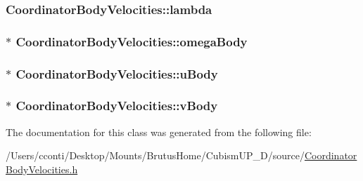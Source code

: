 \subsubsection[{lambda}]{ Coordinator\+Body\+Velocities\+::lambda\hspace{0.3cm}{\ttfamily [protected]}}\label{class_coordinator_body_velocities_afd8b8760d3e9f7fe256ced94c5c8ba15}
\hypertarget{class_coordinator_body_velocities_a90b12064de38ba17d4d66198e73ffcbf}{}
\subsubsection[{omega\+Body}]{ $\ast$ Coordinator\+Body\+Velocities\+::omega\+Body\hspace{0.3cm}{\ttfamily [protected]}}\label{class_coordinator_body_velocities_a90b12064de38ba17d4d66198e73ffcbf}
\hypertarget{class_coordinator_body_velocities_ad44f24f272833d8f8958ea945543eff6}{}
\subsubsection[{u\+Body}]{$\ast$ Coordinator\+Body\+Velocities\+::u\+Body\hspace{0.3cm}{\ttfamily [protected]}}\label{class_coordinator_body_velocities_ad44f24f272833d8f8958ea945543eff6}
\hypertarget{class_coordinator_body_velocities_a5802af8438271a7ee6253f2a1c0695c4}{}
\subsubsection[{v\+Body}]{ $\ast$ Coordinator\+Body\+Velocities\+::v\+Body\hspace{0.3cm}{\ttfamily [protected]}}\label{class_coordinator_body_velocities_a5802af8438271a7ee6253f2a1c0695c4}


The documentation for this class was generated from the following file\+:\begin{DoxyCompactItemize}
\item 
/\+Users/cconti/\+Desktop/\+Mounts/\+Brutus\+Home/\+Cubism\+U\+P\+\_\+D/source/\hyperlink{_coordinator_body_velocities_8h}{Coordinator\+Body\+Velocities.\+h}\end{DoxyCompactItemize}
